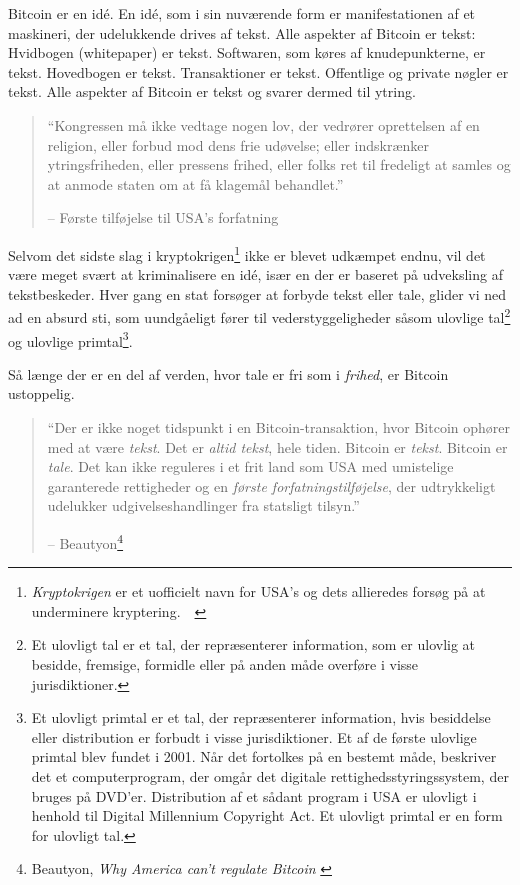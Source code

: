 \documentclass[paper=6in:9in,pagesize=pdftex,headinclude=on,footinclude=on,12pt]{scrbook}
\begin{document}
Bitcoin er en id\'e. En id\'e, som i sin nuværende form er manifestationen af et maskineri, der udelukkende drives af tekst. Alle aspekter af Bitcoin er tekst: Hvidbogen (whitepaper) er tekst. Softwaren, som køres af knudepunkterne, er tekst. Hovedbogen er tekst. Transaktioner er tekst. Offentlige og private nøgler er tekst. Alle aspekter af Bitcoin er tekst og svarer dermed til ytring.\begin{quotation}\begin{samepage} \enquote{Kongressen må ikke vedtage nogen lov, der vedrører oprettelsen af en religion, eller forbud mod dens frie udøvelse; eller indskrænker ytringsfriheden, eller pressens frihed, eller folks ret til fredeligt at samles og at anmode staten om at få klagemål behandlet.} \begin{flushright} -- Første tilføjelse til USA's forfatning \end{flushright}\end{samepage}\end{quotation}

Selvom det sidste slag i kryptokrigen\footnote{\textit{Kryptokrigen} er et uofficielt navn for USA's og dets allieredes forsøg på at underminere kryptering.~\cite{eff-cryptowars}~\cite{wiki:cryptowars}} ikke er blevet udkæmpet endnu, vil det være meget svært at kriminalisere en id\'e, især en der er baseret på udveksling af tekstbeskeder. Hver gang en stat forsøger at forbyde tekst eller tale, glider vi ned ad en absurd sti, som uundgåeligt fører til vederstyggeligheder såsom ulovlige tal\footnote{Et ulovligt tal er et tal, der repræsenterer information, som er ulovlig at besidde, fremsige, formidle eller på anden måde overføre i visse jurisdiktioner.\cite{wiki:illegal-number}} og ulovlige primtal\footnote{Et ulovligt primtal er et tal, der repræsenterer information, hvis besiddelse eller distribution er forbudt i visse jurisdiktioner. Et af de første ulovlige primtal blev fundet i 2001. Når det fortolkes på en bestemt måde, beskriver det et computerprogram, der omgår det digitale rettighedsstyringssystem, der bruges på DVD'er. Distribution af et sådant program i USA er ulovligt i henhold til Digital Millennium Copyright Act. Et ulovligt primtal er en form for ulovligt tal.\cite{wiki:illegal-prime}}.

Så længe der er en del af verden, hvor tale er fri som i \textit{frihed}, er Bitcoin ustoppelig.\begin{quotation}\begin{samepage} \enquote{Der er ikke noget tidspunkt i en Bitcoin-transaktion, hvor Bitcoin ophører med at være \textit{tekst}. Det er \textit{altid tekst}, hele tiden. \href{...}{} Bitcoin er \textit{tekst}. Bitcoin er \textit{tale}. Det kan ikke reguleres i et frit land som USA med umistelige garanterede rettigheder og en \textit{første forfatningstilføjelse}, der udtrykkeligt udelukker udgivelseshandlinger fra statsligt tilsyn.} \begin{flushright} -- Beautyon\footnote{Beautyon, \textit{Why America can't regulate Bitcoin} \cite{america-regulate-bitcoin}}
\end{flushright}\end{samepage}\end{quotation}
\end{document}
